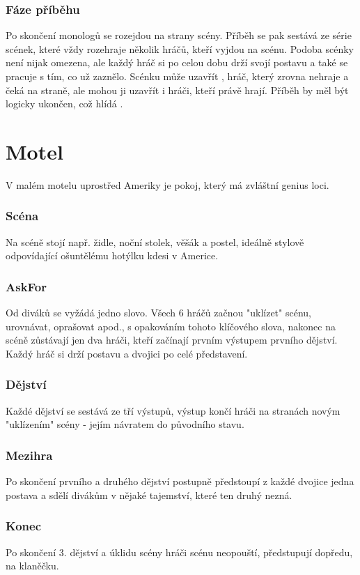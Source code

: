 \documentclass[main.tex]{subfiles}
\begin{document}
\subsubsection{ Fáze příběhu } Po skončení monologů se  rozejdou na strany scény. Příběh se pak sestává ze série scének, které vždy rozehraje několik hráčů, kteří vyjdou na scénu. Podoba scénky není nijak omezena, ale každý hráč si po celou dobu drží svojí postavu a také se pracuje s tím, co už zaznělo. Scénku může uzavřít , hráč, který zrovna nehraje a čeká na straně, ale mohou ji uzavřít i hráči, kteří právě hrají. Příběh by měl být logicky ukončen, což hlídá . 
 
 
 
\needspace{5cm} \section{Motel} \label{motel} V malém motelu uprostřed Ameriky je pokoj, který má zvláštní genius loci. 
\subsubsection{Scéna} Na scéně stojí např. židle, noční stolek, věšák a postel, ideálně stylově odpovídající ošuntělému hotýlku kdesi v Americe. 
\subsubsection{AskFor} Od diváků se vyžádá jedno slovo.  
Všech 6 hráčů začnou "uklízet"{} scénu, urovnávat, oprašovat apod., s opakováním tohoto klíčového slova, nakonec na scéně zůstávají jen dva hráči, kteří začínají prvním výstupem prvního dějství. 
Každý hráč si drží postavu a dvojici po celé představení. 
\subsubsection{Dějství} Každé dějství se sestává ze tří výstupů, výstup končí hráči na stranách novým "uklízením"{} scény - jejím návratem do původního stavu. 
\subsubsection{Mezihra} Po skončení prvního a druhého dějství postupně předstoupí z každé dvojice jedna postava a sdělí divákům v  nějaké tajemství, které ten druhý nezná. 
\subsubsection{Konec} Po skončení 3. dějství a úklidu scény hráči scénu neopouští, předstupují dopředu, na klaněčku. 
 
\end{document}
